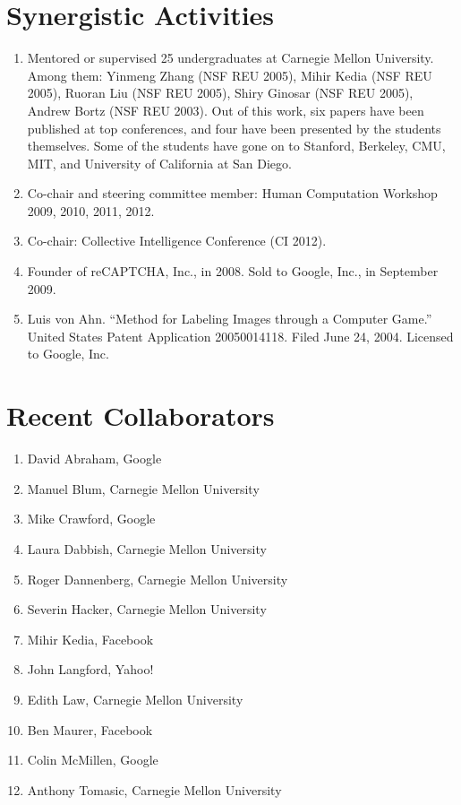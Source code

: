 \documentclass{article}
\newenvironment{denseenumerate}%
	{\begin{enumerate}\setlength{\itemsep}{0pt}\setlength{\parsep}{0pt}}%
	{\end{enumerate}}
\begin{document}
\section*{Synergistic Activities}
\begin{denseenumerate}
\item Mentored or supervised 25 undergraduates at Carnegie Mellon University. 
Among them: Yinmeng Zhang (NSF REU 2005), Mihir Kedia (NSF REU 2005), 
Ruoran Liu (NSF REU 2005), Shiry Ginosar (NSF REU 2005), Andrew Bortz 
(NSF REU 2003). Out of this work, six papers have been published at top 
conferences, and four have been presented by the students themselves. 
Some of the students have gone on to Stanford, Berkeley, CMU, MIT, and 
University of California at San Diego.

\item Co-chair and steering committee member: Human Computation Workshop 
2009, 2010, 2011, 2012.

\item Co-chair: Collective Intelligence Conference (CI 2012).

\item Founder of reCAPTCHA, Inc., in 2008. Sold to Google, Inc., in September 
2009.

\item Luis von Ahn. ``Method for Labeling Images through a Computer Game.''
United States Patent Application 20050014118. Filed June 24, 2004. 
Licensed to Google, Inc.
\end{denseenumerate}

\section*{Recent Collaborators}
\begin{denseenumerate}
\item David Abraham, Google 
\item Manuel Blum, Carnegie Mellon University 
\item Mike Crawford, Google
\item Laura Dabbish, Carnegie Mellon University
\item Roger Dannenberg, Carnegie Mellon University 
\item Severin Hacker, Carnegie Mellon University 
\item Mihir Kedia, Facebook 
\item John Langford, Yahoo!
\item Edith Law, Carnegie Mellon University 
\item Ben Maurer, Facebook 
\item Colin McMillen, Google
\item Anthony Tomasic, Carnegie Mellon University
\end{denseenumerate}
\end{document}
